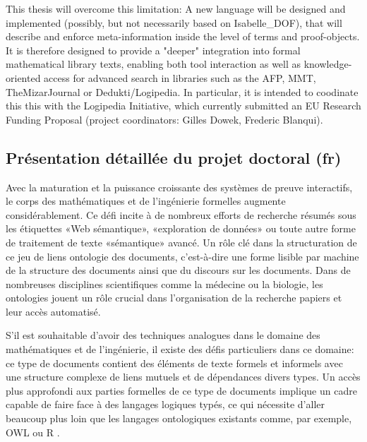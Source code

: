 \documentclass[a4paper,10pt]{article}
\begin{document}
This thesis will overcome this limitation: A new language will be designed and implemented (possibly, but not necessarily based on Isabelle\_DOF),
that will describe and enforce meta-information inside the level of terms and proof-objects. It is therefore designed to provide a "deeper"
integration into formal mathematical library texts, enabling both tool interaction as well as knowledge-oriented access for advanced search
in libraries such as the AFP, MMT, TheMizarJournal or Dedukti/Logipedia\cite{afp,mmt,TheMizarJournal,dedukti}. In particular, it is intended
to coodinate this this with the Logipedia Initiative, which currently submitted an EU Research Funding Proposal 
(project coordinators: Gilles Dowek, Frederic Blanqui).  

\subsection*{Présentation détaillée du projet doctoral (fr)}
Avec la maturation et la puissance croissante des systèmes de preuve interactifs, le corps des mathématiques et de l'ingénierie formelles augmente considérablement. Ce défi incite à de nombreux efforts de recherche résumés sous les étiquettes «Web sémantique», «exploration de données» ou toute autre forme de traitement de texte «sémantique» avancé. Un rôle clé dans la structuration de ce jeu de liens ontologie des documents, c'est-à-dire une forme lisible par machine de la structure des documents ainsi que du discours sur les documents. Dans de nombreuses disciplines scientifiques comme la médecine ou la biologie, les ontologies jouent un rôle crucial dans l'organisation de la recherche
papiers et leur accès automatisé.

S'il est souhaitable d'avoir des techniques analogues dans le domaine des mathématiques et de l'ingénierie, il existe des défis particuliers dans ce domaine: ce type de documents contient des éléments de texte formels et informels avec une structure complexe de liens mutuels et de dépendances
divers types. Un accès plus approfondi aux parties formelles de ce type de documents implique un cadre capable de faire face à des langages logiques typés, ce qui nécessite d'aller beaucoup plus loin que les langages ontologiques existants comme, par exemple, OWL ou R 
\cite {owl2012,protege,owlgred,rontorium}.
\end{document}
